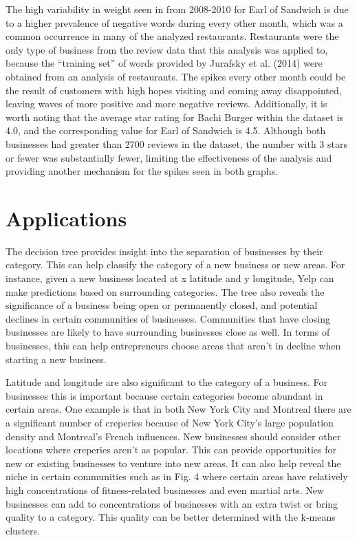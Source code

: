 \quad The high variability in weight seen in from 2008-2010 for Earl of Sandwich is due to a higher prevalence of negative words during every other month, which was a common occurrence in many of the analyzed restaurants. Restaurants were the only type of business from the review data that this analysis was applied to, because the “training set” of words provided by Jurafsky et al. (2014) were obtained from an analysis of restaurants. The spikes every other month could be the result of customers with high hopes visiting and coming away disappointed, leaving waves of more positive and more negative reviews. Additionally, it is worth noting that the average star rating for Bachi Burger within the dataset is 4.0, and the corresponding value for Earl of Sandwich is 4.5. Although both businesses had greater than 2700 reviews in the dataset, the number with 3 stars or fewer was substantially fewer, limiting the effectiveness of the analysis and providing another mechanism for the spikes seen in both graphs.

\section{Applications}

\quad The decision tree provides insight into the separation of businesses by their category. This can help classify the category of a new business or new areas. For instance, given a new business located at x latitude and y longitude, Yelp can make predictions based on surrounding categories. The tree also reveals the significance of a business being open or permanently closed, and potential declines in certain communities of businesses. Communities that have closing businesses are likely to have surrounding businesses close as well. In terms of businesses, this can help entrepreneurs choose areas that aren’t in decline when starting a new business.

\quad Latitude and longitude are also significant to the category of a business. For businesses this is important because certain categories become abundant in certain areas. One example is that in both New York City and Montreal there are a significant number of creperies because of New York City’s large population density and Montreal’s French influences. New businesses should consider other locations where creperies aren’t as popular. This can provide opportunities for new or existing businesses to venture into new areas. It can also help reveal the niche in certain communities such as in Fig. 4 where certain areas have relatively high concentrations of fitness-related businesses and even martial arts. New businesses can add to concentrations of businesses with an extra twist or bring quality to a category. This quality can be better determined with the k-means clusters.

